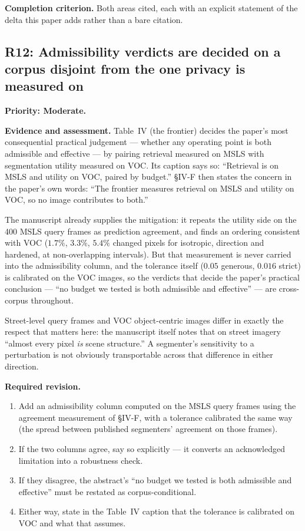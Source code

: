 \documentclass[11pt,a4paper]{article}
\newcommand{\finding}[3]{\subsection{#1: #3}\label{rev:#1}\textbf{Priority: #2.}}
\newcommand{\evidence}{\par\textbf{Evidence and assessment.} }
\newcommand{\action}{\par\textbf{Required revision.} }
\newcommand{\acceptance}{\par\textbf{Completion criterion.} }
\begin{document}
\acceptance
Both areas cited, each with an explicit statement of the delta this paper adds
rather than a bare citation.

\finding{R12}{Moderate}{Admissibility verdicts are decided on a corpus disjoint
from the one privacy is measured on}

\evidence
Table~IV (the frontier) decides the paper's most consequential practical
judgement --- whether any operating point is both admissible and effective ---
by pairing retrieval measured on MSLS with segmentation utility measured on
VOC. Its caption says so: ``Retrieval is on MSLS and utility on VOC, paired by
budget.'' \S IV-F then states the concern in the paper's own words: ``The
frontier measures retrieval on MSLS and utility on VOC, so no image contributes
to both.''

The manuscript already supplies the mitigation: it repeats the utility side on
the 400 MSLS query frames as prediction agreement, and finds an ordering
consistent with VOC ($1.7\%$, $3.3\%$, $5.4\%$ changed pixels for isotropic,
direction and hardened, at non-overlapping intervals). But that measurement is
never carried into the admissibility column, and the tolerance itself
($0.05$ generous, $0.016$ strict) is calibrated on the VOC images, so the
verdicts that decide the paper's practical conclusion --- ``no budget we tested
is both admissible and effective'' --- are cross-corpus throughout.

Street-level query frames and VOC object-centric images differ in exactly the
respect that matters here: the manuscript itself notes that on street imagery
``almost every pixel \emph{is} scene structure.'' A segmenter's sensitivity to
a perturbation is not obviously transportable across that difference in either
direction.

\action
\begin{enumerate}
\item Add an admissibility column computed on the MSLS query frames using the
  agreement measurement of \S IV-F, with a tolerance calibrated the same way
  (the spread between published segmenters' agreement on those frames).
\item If the two columns agree, say so explicitly --- it converts an
  acknowledged limitation into a robustness check.
\item If they disagree, the abstract's ``no budget we tested is both admissible
  and effective'' must be restated as corpus-conditional.
\item Either way, state in the Table~IV caption that the tolerance is
  calibrated on VOC and what that assumes.
\end{enumerate}
\end{document}
